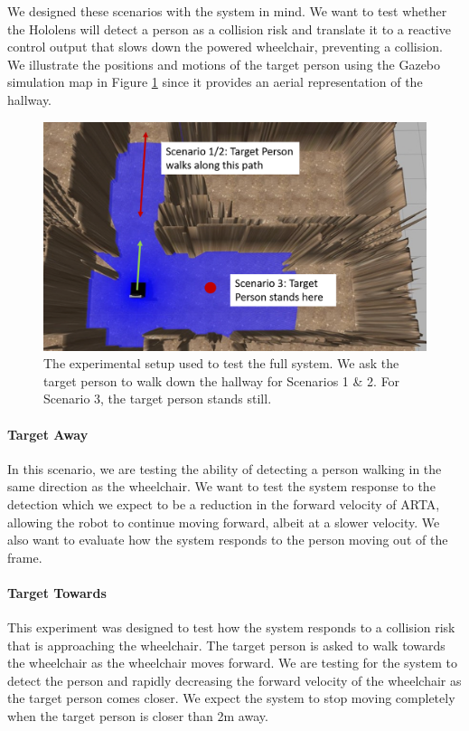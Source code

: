 We designed these scenarios with the system in mind. We want to test whether the Hololens will detect a person as a collision risk and translate it to a reactive control output that slows down the powered wheelchair, preventing a collision. We illustrate the positions and motions of the target person using the Gazebo simulation map in Figure \ref{fig:fullSystemTest} since it provides an aerial representation of the hallway.

\begin{figure}[ht]
	\centering
	\includegraphics[width=0.9\linewidth]{img/chapter6_test/fullSystem.png}
	\caption{The experimental setup used to test the full system. We ask the target person to walk down the hallway for Scenarios 1 \& 2. For Scenario 3, the target person stands still.}
	\label{fig:fullSystemTest}
\end{figure}

\paragraph{Target Away} In this scenario, we are testing the ability of detecting a person walking in the same direction as the wheelchair. We want to test the system response to the detection which we expect to be a reduction in the forward velocity of ARTA, allowing the robot to continue moving forward, albeit at a slower velocity. We also want to evaluate how the system responds to the person moving out of the frame.

\paragraph{Target Towards} This experiment was designed to test how the system responds to a collision risk that is approaching the wheelchair. The target person is asked to walk towards the wheelchair as the wheelchair moves forward. We are testing for the system to detect the person and rapidly decreasing the forward velocity of the wheelchair as the target person comes closer. We expect the system to stop moving completely when the target person is closer than 2m away.

